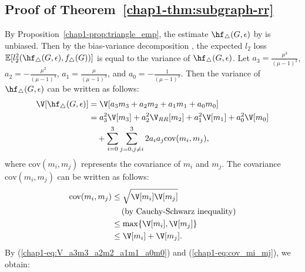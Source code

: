 \subsection{Proof of Theorem~\ref{chap1-thm:subgraph-rr}}
\label{chap1-sub:proof_thm:subgraph-rr}
By Proposition~\ref{chap1-prop:triangle_emp}, the estimate $\hf_{\triangle}(G, \epsilon)$ by  is unbiased. 
Then by the bias-variance decomposition \cite{mlpp}, 
the expected $l_2$ loss $\mathbb{E}[l_2^2(\hf_{\triangle}(G, \epsilon), f_\triangle(G))]$ is equal to the variance of $\hf_{\triangle}(G, \epsilon)$. 
Let 
$a_3 = \frac{\mu^3}{(\mu-1)^3}$, 
$a_2 = - \frac{\mu^2}{(\mu-1)^3}$, 
$a_1 = \frac{\mu}{(\mu-1)^3}$, and 
$a_0 = - \frac{1}{(\mu-1)^3}$. 
Then the variance of $\hf_{\triangle}(G, \epsilon)$ can be written as follows:
\begin{align}
    \V[\hf_{\triangle}(G, \epsilon)] 
    &= \V[a_3 m_3 + a_2 m_2 + a_1 m_1 + a_0 m_0] \nonumber\\
    &= a_3^2 \V[m_3] + a_2^2 \V_{RR}[m_2] + a_1^2 \V[m_1] + a_0^2 \V[m_0] \nonumber\\
    &\hspace{3.5mm} + \sum_{i=0}^3 \sum_{j=0, j \ne i}^3 2a_i a_j \text{cov}(m_i, m_j),
    \label{chap1-eq:V_a3m3_a2m2_a1m1_a0m0}
\end{align}
where $\text{cov}(m_i, m_j)$ represents the covariance of $m_i$ and $m_j$. 
The covariance $\text{cov}(m_i, m_j)$ can be written as follows:
\begin{align}
    \text{cov}(m_i, m_j)
    &\leq \sqrt{\V[m_i] \V[m_j]} \nonumber\\
    &\hspace{4.2mm} (\text{by Cauchy-Schwarz inequality}) \nonumber\\
    &\leq  \max\{ \V[m_i], \V[m_j]\} \nonumber\\
    &\leq \V[m_i] + \V[m_j].
    \label{chap1-eq:cov_mi_mj}
\end{align}
By (\ref{chap1-eq:V_a3m3_a2m2_a1m1_a0m0}) and (\ref{chap1-eq:cov_mi_mj}), we obtain:
